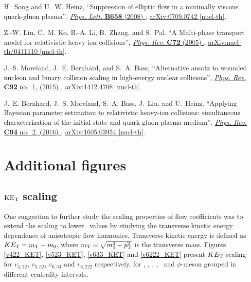 \documentclass[ALICE,manyauthors]{cernphprep}
\begin{document}
\begin{thebibliography}{10}
H.~Song and U.~W. Heinz, ``{Suppression of elliptic flow in a minimally viscous
  quark-gluon plasma}'',
  \href{http://dx.doi.org/10.1016/j.physletb.2007.11.019}{{\em Phys. Lett.}
  {\bfseries B658} (2008) },
\href{http://arxiv.org/abs/0709.0742}{{\ttfamily arXiv:0709.0742 [nucl-th]}}.

Z.-W. Lin, C.~M. Ko, B.-A. Li, B.~Zhang, and S.~Pal, ``{A Multi-phase transport
  model for relativistic heavy ion collisions}'',
  \href{http://dx.doi.org/10.1103/PhysRevC.72.064901}{{\em Phys. Rev.}
  {\bfseries C72} (2005) },
\href{http://arxiv.org/abs/nucl-th/0411110}{{\ttfamily arXiv:nucl-th/0411110
  [nucl-th]}}.

J.~S. Moreland, J.~E. Bernhard, and S.~A. Bass, ``{Alternative ansatz to
  wounded nucleon and binary collision scaling in high-energy nuclear
  collisions}'', \href{http://dx.doi.org/10.1103/PhysRevC.92.011901}{{\em Phys.
  Rev.} {\bfseries C92} no.~1, (2015) },
\href{http://arxiv.org/abs/1412.4708}{{\ttfamily arXiv:1412.4708 [nucl-th]}}.

J.~E. Bernhard, J.~S. Moreland, S.~A. Bass, J.~Liu, and U.~Heinz, ``{Applying
  Bayesian parameter estimation to relativistic heavy-ion collisions:
  simultaneous characterization of the initial state and quark-gluon plasma
  medium}'', \href{http://dx.doi.org/10.1103/PhysRevC.94.024907}{{\em Phys.
  Rev.} {\bfseries C94} no.~2, (2016) },
\href{http://arxiv.org/abs/1605.03954}{{\ttfamily arXiv:1605.03954 [nucl-th]}}.

\end{thebibliography}\endgroup


\newpage
\appendix
\section{Additional figures}

\subsection{$\rm{KE_{T}}$ scaling}
\label{Subsubsection:KETscaling}

One suggestion to further study the scaling properties of flow coefficients was to extend the scaling to lower \pT~values by studying the transverse kinetic energy dependence of anisotropic flow harmonics. Transverse kinetic energy is defined as $KE_{\rm{T}} = m_{\rm{T}} - m_{\rm{0}}$, where $m_{\rm{T}}= \sqrt{m_{0}^2 + p_{\rm{T}}^2}$ is the transverse mass. Figures \ref{v422_KET}, \ref{v523_KET}, \ref{v633_KET} and \ref{v6222_KET} present $KE_{\rm{T}}$ scaling for $v_{4,22}$, $v_{5,32}$, $v_{6,33}$ and $v_{6,222}$ respectively, for \pion, \kaon, \proton, \Ks, \lambdas~and $\phi$-meson grouped in different centrality intervals.
\end{document}
